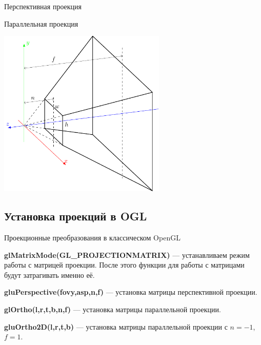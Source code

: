 \documentclass[10pt]{beamer}
\begin{document}
	\begin{frame}
		
		{
			\centering
			
		}
		{
			\centering
			
			Перспективная проекция
			
			
			Параллельная проекция
			
			\includegraphics[page=10, width=0.6\textwidth]{cvv.pdf}
		}
		
	\end{frame}
	
	
	\subsection{Установка проекций в OGL}
	
	\begin{frame}{Проекционные преобразования в классическом OpenGL}
		
		\textbf{glMatrixMode(GL\_PROJECTIONMATRIX)} --- устанавливаем режим работы с матрицей проекции. После этого функции для работы с матрицами будут затрагивать именно её.
		
		\textbf{gluPerspective(fovy,asp,n,f)} --- установка матрицы перспективной проекции.
		
		\textbf{glOrtho(l,r,t,b,n,f)} --- установка матрицы параллельной проекции.
		
		\textbf{gluOrtho2D(l,r,t,b)} --- установка матрицы параллельной проекции с $n=-1$, $f=1$.
		
		
	\end{frame}
	
\end{document}
